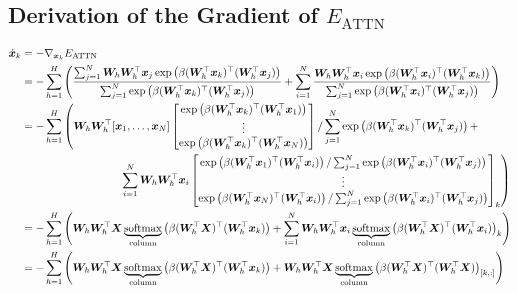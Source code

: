 \subsection[Derivation of the Gradient of EATTN]{Derivation of the Gradient of $E_{\text{ATTN}}$}
\label{section:derivation of E attn}
\begin{align*}
\dot{\vx}_k &= -\nabla_{\vx_k} E_{\text{ATTN}} \\
&= -\sum_{h=1}^H\left(\frac{\sum_{j=1}^N \mW_h \mW_h^\top \vx_j \exp\left(\beta(\mW_h^\top\vx_k)^\top(\mW_h^\top\vx_j)\right)}{\sum_{j=1}^N\exp\left(\beta (\mW_h^\top\vx_k)^\top(\mW_h^\top\vx_j) \right)} + \sum_{i=1}^N \frac{\mW_h\mW_h^\top\vx_i\exp\left(\beta (\mW_h^\top\vx_i)^\top(\mW_h^\top\vx_k) \right)}{\sum_{j=1}^N\exp\left(\beta (\mW_h^\top\vx_i)^\top(\mW_h^\top\vx_j)\right)} \right) \\
& =-\sum_{h=1}^H \left(\mW_h\mW_h^\top[\vx_1, \dots,\vx_N] \begin{bmatrix}
\exp\left(\beta (\mW_h^\top\vx_k)^\top(\mW_h^\top\vx_1) \right) \\
\vdots \\
\exp\left(\beta (\mW_h^\top\vx_k)^\top(\mW_h^\top\vx_N) \right) 
\end{bmatrix} / \sum_{j=1}^N\exp\left(\beta (\mW_h^\top\vx_k)^\top(\mW_h^\top\vx_j) \right) + \right. \\
&\left.  \qquad \qquad \qquad \qquad \quad 
\sum_{i=1}^N \mW_h\mW_h^\top\vx_i\begin{bmatrix}
    \exp\left(\beta (\mW_h^\top\vx_1)^\top(\mW_h^\top\vx_i) \right) / \sum_{j=1}^N\exp\left(\beta (\mW_h^\top\vx_i)^\top(\mW_h^\top\vx_j)\right)\\
    \vdots \\
    \exp\left(\beta (\mW_h^\top\vx_N)^\top(\mW_h^\top\vx_i) \right) / \sum_{j=1}^N\exp\left(\beta (\mW_h^\top\vx_i)^\top(\mW_h^\top\vx_j)\right)
\end{bmatrix}_{k} \right)\\
&= -\sum_{h=1}^H \left(\mW_h\mW_h^\top\mX\underbrace{\operatorname{softmax}}_{\text{column}}\left(\beta (\mW_h^\top\mX)^\top(\mW_h^\top\vx_k)\right) + \sum_{i=1}^N \mW_h \mW_h^\top \vx_i \underbrace{\operatorname{softmax}}_{\text{column}}\left(\beta (\mW_h^\top\mX)^\top(\mW_h^\top\vx_i)\right)_k\right) \\
&= -\sum_{h=1}^H \left(\mW_h\mW_h^\top\mX\underbrace{\operatorname{softmax}}_{\text{column}}\left(\beta (\mW_h^\top\mX)^\top(\mW_h^\top\vx_k)\right) + \mW_h \mW_h^\top \mX \underbrace{\operatorname{softmax}}_{\text{column}}\left(\beta (\mW_h^\top\mX)^\top(\mW_h^\top\mX)\right)_{[k,:]}\right) \\

\end{align*}

